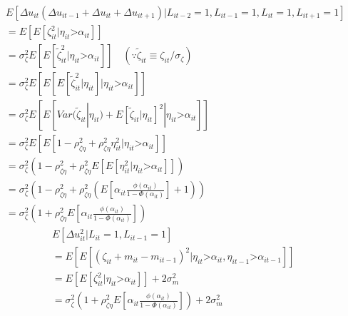 \documentclass[paper=a4, fontsize=13pt]{extarticle} %
\numberwithin{equation}{section} %
\numberwithin{figure}{section} %
\numberwithin{table}{section} %
\begin{document}
\begin{eqnarray*}
&& E \left[ \Delta u_{it} (\Delta u_{it-1} + \Delta u_{it} + \Delta u_{it+1}) | L_{it-2} =1, L_{it-1}=1, L_{it}=1, L_{it+1}=1  \right] \\
&& = E\left[ E \left[ \zeta_{it}^2 | \eta_{it} \mbox{>} \alpha_{it} \right] \right] \\
&& = \sigma_{\zeta}^2 E\left[ E \left[ \tilde{\zeta}_{it}^2 | \eta_{it} \mbox{>} \alpha_{it} \right] \right] \quad  (\because \tilde{\zeta}_{it} \equiv \zeta_{it} / \sigma_{\zeta}) \\
&& = \sigma_{\zeta}^2 E\left[ E \left[ E \left[ \tilde{\zeta}_{it}^2 | \eta_{it} \right] | \eta_{it} \mbox{>} \alpha_{it} \right] \right] \\
&& = \sigma_{\zeta}^2 E \left[ E \left[ Var(\tilde{\zeta}_{it} | \eta_{it}) + E \left[ \tilde{\zeta}_{it} | \eta_{it} \right]^2  | \eta_{it} \mbox{>} \alpha_{it} \right] \right] \\
&& = \sigma_{\zeta}^2 E\left[ E \left[ 1 - \rho_{\zeta \eta}^2 +  \rho_{\zeta \eta}^2 \eta_{it}^2 | \eta_{it} \mbox{>} \alpha_{it} \right] \right]  \\
&& = \sigma_{\zeta}^2 \left( 1 - \rho_{\zeta \eta}^2 + \rho_{\zeta \eta}^2 E\left[ E \left[ \eta_{it}^2 | \eta_{it} \mbox{>} \alpha_{it}  \right] \right]  \right) \\
&& = \sigma_{\zeta}^2 ( 1 - \rho_{\zeta \eta}^2 + \rho_{\zeta \eta}^2  (  E\left[ \alpha_{it} \frac{\phi(\alpha_{it})}{1-\Phi(\alpha_{it})} \right] + 1) ) \\
&& = \sigma_{\zeta}^2 ( 1 + \rho_{\zeta \eta}^2 E\left[ \alpha_{it} \frac{\phi(\alpha_{it})}{1 - \Phi(\alpha_{it}) } \right] )
\end{eqnarray*}
\begin{eqnarray*}
&& E \left[ \Delta u_{it}^2 | L_{it}=1, L_{it-1}=1 \right] \\
&& = E\left[ E \left[ (\zeta_{it} + m_{it} - m_{it-1})^2 | \eta_{it} \mbox{>} \alpha_{it}, \eta_{it-1} \mbox{>} \alpha_{it-1} \right] \right] \\
&& = E\left[ E \left[ \zeta_{it}^2 | \eta_{it} \mbox{>} \alpha_{it} \right] \right] + 2 \sigma_m^2 \\
&& = \sigma_{\zeta}^2 ( 1 + \rho_{\zeta \eta}^2 E\left[ \alpha_{it} \frac{\phi(\alpha_{it})}{1 - \Phi(\alpha_{it}) } \right]  ) + 2 \sigma_m^2
\end{eqnarray*}
\end{document}
